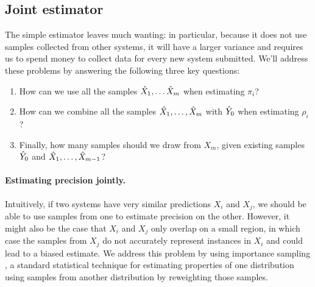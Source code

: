 \subsection{Joint estimator}
The simple estimator leaves much wanting: in particular, because it does not use samples collected from other systems, it will have a larger variance and requires us to spend money to collect data for every new system submitted.
We'll address these problems by answering the following three key questions:
\begin{enumerate}
  \item How can we use all the samples ${\hat{X}}_1, \ldots {\hat{X}}_m$ when estimating $\pi_i$?
  \item How can we combine all the samples ${\hat{X}}_1, \ldots, {\hat{X}}_m$ with ${\hat{Y}}_0$ when estimating $\rho_i$?
  \item Finally, how many samples should we draw from $X_m$, given existing samples ${\hat{Y}}_0$ and ${\hat{X}}_1, \ldots, {\hat{X}}_{m-1}$?
\end{enumerate}
%
%
%

\paragraph{Estimating precision jointly.}
Intuitively, if two systems have very similar predictions $X_i$ and $X_j$, we should be able to use samples from one to estimate precision on the other.
However, it might also be the case that $X_i$ and $X_j$ only overlap on a small region, in which case the samples from $X_j$ do not accurately represent instances in $X_i$ and could lead to a biased estimate.
We address this problem by using importance sampling \citep{owen2013monte}, a standard statistical technique for estimating properties of one distribution using samples from another distribution by reweighting those samples.

